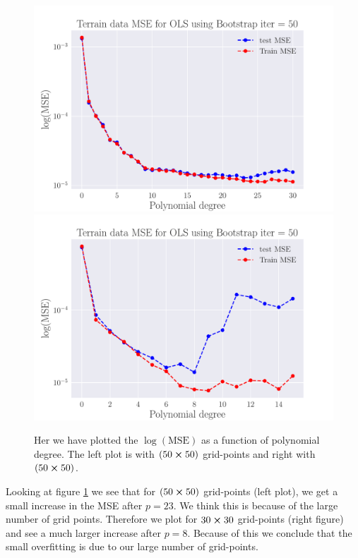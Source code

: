 \documentclass[reprint,english,notitlepage,aps,nobalancelastpage,nofootinbib]{revtex4-1}  %
\begin{document}
\begin{figure}[H]
  \includegraphics[width=\linewidth]{SRTM_MSE_OLS_n50_pol30_Bootstrap_re50_log.pdf}
  \endminipage\hfill
  \includegraphics[width=\linewidth]{SRTM_MSE_OLS_n30_pol15_Bootstrap_re50_log.pdf}
  \endminipage
  \caption{Her we have plotted the $\log(\text{MSE})$ as a function of polynomial degree. The left plot is with $(50\cross50)$ grid-points and right with $(50\cross50)$.}
  \label{fig:terrain_OLS_MSE_bootstrap}
\end{figure}

Looking at figure \ref{fig:terrain_OLS_MSE_bootstrap} we see that for $(50\cross50)$ grid-points (left plot), we get a small increase in the MSE after $p = 23$. We think this is because of the large number of grid points. Therefore we plot for $30\cross30$ grid-points (right figure) and see a much larger increase after $p = 8$. Because of this we conclude that the small overfitting is due to our large number of grid-points. 
\end{document}
